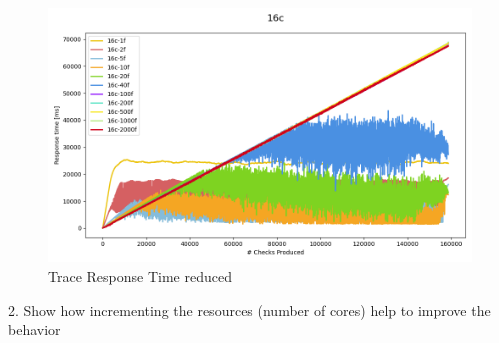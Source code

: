 \documentclass[12pt,a4paper]{article}
\begin{document}
\begin{figure}[H]
    \centering
    \includegraphics[scale=0.5]{../processed/NRT/small/checks/120-0.02/fixedcores/16c/plots/traces-response-time-reduced.png}
    \caption*{Trace Response Time reduced}
\end{figure}


2. Show how incrementing the resources (number of cores) help to improve the behavior
\end{document}
